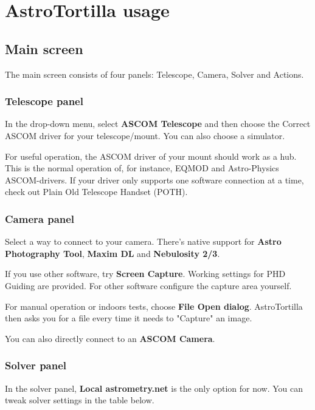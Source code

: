 \documentclass[english]{article}
\begin{document}
\newpage

\section{AstroTortilla usage}

\subsection{Main screen}

The main screen consists of four panels: Telescope, Camera, Solver and Actions.

\subsubsection{Telescope panel}

In the drop-down menu, select \textbf{ASCOM Telescope} and then choose the Correct 
ASCOM driver for your telescope/mount. You can also choose a simulator.

For useful operation, the ASCOM driver of your mount should work as a hub.
This is the normal operation of, for instance, EQMOD and Astro-Physics
ASCOM-drivers. If your driver only supports one software connection at a 
time, check out Plain Old Telescope Handset (POTH).

\subsubsection{Camera panel}

Select a way to connect to your camera. There's native support for \textbf{Astro Photography Tool}, \textbf{Maxim DL} and \textbf{Nebulosity 2/3}.

If you use other software, try \textbf{Screen Capture}. Working settings for PHD Guiding are provided. For other software configure the capture area yourself.

For manual operation or indoors tests, choose \textbf{File Open dialog}. AstroTortilla then asks you for a file every time it needs to "Capture" an image.

You can also directly connect to an \textbf{ASCOM Camera}.


\subsubsection{Solver panel}

In the solver panel, \textbf{Local astrometry.net} is the only option for now. You can tweak solver settings in the table below.
\end{document}

